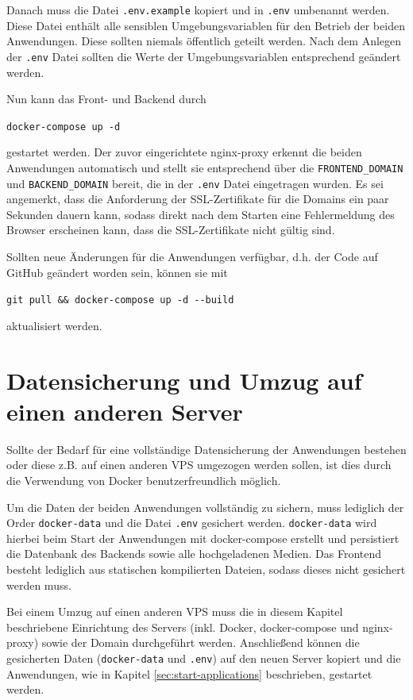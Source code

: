 Danach muss die Datei \lstinline{.env.example} kopiert und in \lstinline{.env} umbenannt werden. Diese Datei enthält alle sensiblen Umgebungsvariablen für den Betrieb der beiden Anwendungen. Diese sollten niemals öffentlich geteilt werden. Nach dem Anlegen der \lstinline{.env} Datei sollten die Werte der Umgebungsvariablen entsprechend geändert werden.

Nun kann das Front- und Backend durch

\begin{center}
  \lstinline{docker-compose up -d}
\end{center}

gestartet werden. Der zuvor eingerichtete nginx-proxy erkennt die beiden Anwendungen automatisch und stellt sie entsprechend über die \lstinline{FRONTEND_DOMAIN} und \lstinline{BACKEND_DOMAIN} bereit, die in der \lstinline{.env} Datei eingetragen wurden. Es sei angemerkt, dass die Anforderung der SSL-Zertifikate für die Domains ein paar Sekunden dauern kann, sodass direkt nach dem Starten eine Fehlermeldung des Browser erscheinen kann, dass die SSL-Zertifikate nicht gültig sind.

Sollten neue Änderungen für die Anwendungen verfügbar, d.h. der Code auf GitHub geändert worden sein, können sie mit

\begin{center}
  \lstinline{git pull && docker-compose up -d --build}
\end{center}

aktualisiert werden.

\section{Datensicherung und Umzug auf einen anderen Server}
Sollte der Bedarf für eine vollständige Datensicherung der Anwendungen bestehen oder diese z.B. auf einen anderen \ac{VPS} umgezogen werden sollen, ist dies durch die Verwendung von Docker benutzerfreundlich möglich.

Um die Daten der beiden Anwendungen vollständig zu sichern, muss lediglich der Order \lstinline{docker-data} und die Datei \lstinline{.env} gesichert werden. \lstinline{docker-data} wird hierbei beim Start der Anwendungen mit docker-compose erstellt und persistiert die Datenbank des Backends sowie alle hochgeladenen Medien. Das Frontend besteht lediglich aus statischen kompilierten Dateien, sodass dieses nicht gesichert werden muss.

Bei einem Umzug auf einen anderen \ac{VPS} muss die in diesem Kapitel beschriebene Einrichtung des Servers (inkl. Docker, docker-compose und nginx-proxy) sowie der Domain durchgeführt werden. Anschließend können die gesicherten Daten (\lstinline{docker-data} und \lstinline{.env}) auf den neuen Server kopiert und die Anwendungen, wie in Kapitel \ref{sec:start-applications} beschrieben, gestartet werden.
